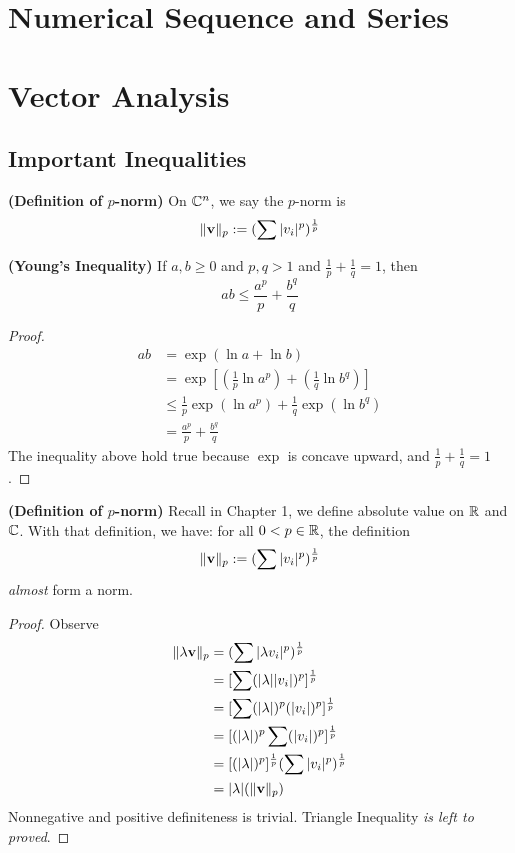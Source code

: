 \documentclass{report}
\begin{document}
\chapter{Numerical Sequence and Series}
\chapter{Vector Analysis}
\section{Important Inequalities}
\begin{definition}
\label{4.1.1}
\textbf{(Definition of $p$-norm)} On $\mathbb{C}^n$, we say the  $p$-norm is 
\begin{equation}
  \| \textbf{v} \|_p:= (\sum |v_i|^p)^{\frac{1}{p}}
\end{equation}
\end{definition}
\begin{theorem}
\label{4.1.2}
\textbf{(Young's Inequality)} If $a,b\geq 0$ and $p,q>1$ and  $\frac{1}{p}+\frac{1}{q}=1$, then
\begin{equation}
ab\leq \frac{a^p}{p}+\frac{b^q}{q}
\end{equation}
\end{theorem}
\begin{proof}
\begin{align}
  ab&=\exp(\ln a+ \ln b)\\
    &=\exp[(\frac{1}{p}\ln a^p)+(\frac{1}{q}\ln b^q)]\\
&\leq \frac{1}{p}\exp(\ln a^p)+\frac{1}{q}\exp(\ln b^q)\\
&= \frac{a^p}{p}+\frac{b^q}{q}
\end{align}
The inequality above hold true because  $\exp$ is concave upward, and $\frac{1}{p}+\frac{1}{q}=1$. 
\end{proof}
\begin{theorem}
\label{4.1.3}
\textbf{(Definition of $p$-norm)} Recall in Chapter 1, we define absolute value on $\mathbb{R}$ and  $\mathbb{C}$. With that definition, we have: for all $0<p \in \mathbb{R}$, the definition
\begin{equation}
  \| \textbf{v} \|_p:= (\sum |v_i|^p)^{\frac{1}{p}}
\end{equation}
\textit{almost} form a norm.
\end{theorem}
\begin{proof}
Observe 
\begin{align}
\| \lambda \textbf{v} \|_p&=(\sum |\lambda v_i|^p)^{\frac{1}{p}} \\
&=[\sum (|\lambda ||v_i|)^p]^{\frac{1}{p}}\\
&=[\sum (|\lambda |)^p(|v_i|)^p]^{\frac{1}{p}}\\
&=[(|\lambda |)^p\sum (|v_i|)^p]^{\frac{1}{p}}\\
&=[(|\lambda |)^p]^{\frac{1}{p}}(\sum |v_i|^p)^{\frac{1}{p}}\\
&=|\lambda |(\| \textbf{v} \|_p)
\end{align}
Nonnegative and positive definiteness is trivial. Triangle Inequality \textit{is left to proved}. 
\end{proof}
\end{document}
